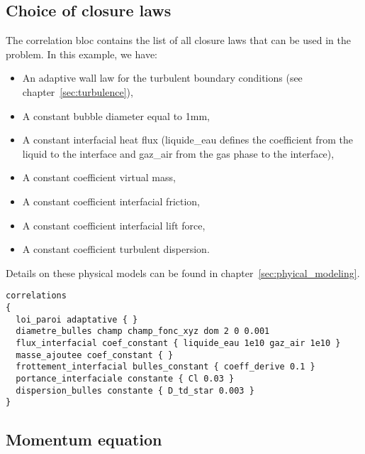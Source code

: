 \subsection{Choice of closure laws}

The correlation bloc contains the list of all closure laws that can be used in the problem.
In this example, we have:
\begin{itemize}
    \item[\small \textcolor{blue}{\ding{109}}] An adaptive wall law for the turbulent boundary conditions (see chapter~\ref{sec:turbulence}),
    \item[\small \textcolor{blue}{\ding{109}}] A constant bubble diameter equal to 1mm,
    \item[\small \textcolor{blue}{\ding{109}}] A constant interfacial heat flux (liquide_eau defines the coefficient from the liquid to the interface and gaz_air from the gas phase to the interface),
    \item[\small \textcolor{blue}{\ding{109}}]A constant coefficient virtual mass,
    \item[\small \textcolor{blue}{\ding{109}}]A constant coefficient interfacial friction,
    \item[\small \textcolor{blue}{\ding{109}}] A constant coefficient interfacial lift force,
    \item[\small \textcolor{blue}{\ding{109}}] A constant coefficient turbulent dispersion.
\end{itemize} 
Details on these physical models can be found in chapter~\ref{sec:phyical_modeling}.

\begin{lstlisting}
correlations
{
  loi_paroi adaptative { }
  diametre_bulles champ champ_fonc_xyz dom 2 0 0.001
  flux_interfacial coef_constant { liquide_eau 1e10 gaz_air 1e10 }
  masse_ajoutee coef_constant { }
  frottement_interfacial bulles_constant { coeff_derive 0.1 }
  portance_interfaciale constante { Cl 0.03 }
  dispersion_bulles constante { D_td_star 0.003 }
}
\end{lstlisting}

\subsection{Momentum equation}

